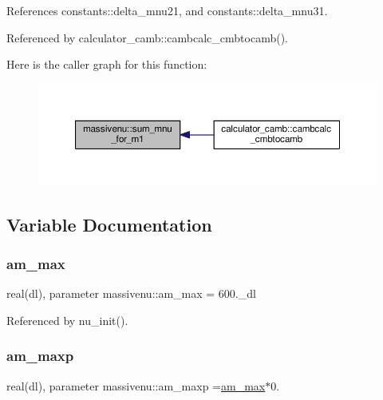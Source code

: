 References constants\+::delta\+\_\+mnu21, and constants\+::delta\+\_\+mnu31.



Referenced by calculator\+\_\+camb\+::cambcalc\+\_\+cmbtocamb().

Here is the caller graph for this function\+:
\nopagebreak
\begin{figure}[H]
\begin{center}
\leavevmode
\includegraphics[width=350pt]{namespacemassivenu_a872d62098a8fc9b6d372d05bc210c428_icgraph}
\end{center}
\end{figure}


\subsection{Variable Documentation}
\mbox{\label{namespacemassivenu_a41419034ccb5dbf62c14483531ca5fb1}} 
\subsubsection{\texorpdfstring{am\+\_\+max}{am\_max}}
{\footnotesize\ttfamily real(dl), parameter massivenu\+::am\+\_\+max = 600.\+\_\+dl\hspace{0.3cm}{\ttfamily [private]}}



Referenced by nu\+\_\+init().

\mbox{\label{namespacemassivenu_a70711a9642331142a38cd93e15ae874a}} 
\subsubsection{\texorpdfstring{am\+\_\+maxp}{am\_maxp}}
{\footnotesize\ttfamily real(dl), parameter massivenu\+::am\+\_\+maxp =\mbox{\hyperlink{namespacemassivenu_a41419034ccb5dbf62c14483531ca5fb1}{am\+\_\+max}}$\ast$0.\hspace{0.3cm}{\ttfamily [private]}}



